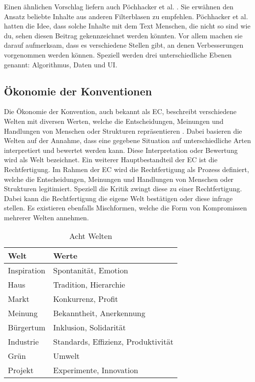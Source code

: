 Einen ähnlichen Vorschlag liefern auch Pöchhacker et al. \cite{rundfunk}.
Sie erwähnen den Ansatz beliebte Inhalte aus anderen Filterblasen zu empfehlen.
Pöchhacker et al. hatten die Idee, dass solche Inhalte mit dem Text \glqq Menschen, die nicht so sind wie du, sehen diesen Beitrag\grqq{} gekennzeichnet werden könnten.
Vor allem machen sie darauf aufmerksam, dass es verschiedene Stellen gibt, an denen Verbesserungen vorgenommen werden können.
Speziell werden drei unterschiedliche Ebenen genannt: Algorithmus, Daten und UI.

\subsection{Ökonomie der Konventionen} \label{subsec:economics-of-conventions}
Die Ökonomie der Konvention, auch bekannt als \ac{EC}, beschreibt verschiedene \glqq Welten\grqq{} mit diversen Werten, welche die Entscheidungen, Meinungen und Handlungen von Menschen oder Strukturen repräsentieren \cite{on-justification, oekonomie-konventionen}.
Dabei basieren die Welten auf der Annahme, dass eine gegebene Situation auf unterschiedliche Arten interpretiert und bewertet werden kann.
Diese Interpretation oder Bewertung wird als Welt bezeichnet.
Ein weiterer Hauptbestandteil der \ac{EC} ist die Rechtfertigung.
Im Rahmen der \ac{EC} wird die Rechtfertigung als Prozess definiert, welche die Entscheidungen, Meinungen und Handlungen von Menschen oder Strukturen legitimiert.
Speziell die Kritik zwingt diese zu einer Rechtfertigung.
Dabei kann die Rechtfertigung die eigene Welt bestätigen oder diese infrage stellen.
Es existieren ebenfalls Mischformen, welche die Form von Kompromissen mehrerer Welten annehmen.
\begin{center}
    \begin{table}[!ht]
        \centering
        \begin{tabular}{|l l|}
            \hline
            Welt        & Werte                               \\ \hline
            Inspiration & Spontanität, Emotion                \\
            Haus        & Tradition, Hierarchie               \\
            Markt       & Konkurrenz, Profit                  \\
            Meinung     & Bekanntheit, Anerkennung            \\
            Bürgertum   & Inklusion, Solidarität              \\
            Industrie   & Standards, Effizienz, Produktivität \\ \hline \hline
            Grün        & Umwelt                              \\
            Projekt     & Experimente, Innovation             \\ \hline
        \end{tabular}
        \caption{Acht Welten}
        \label{table:eight-worlds}
    \end{table}
\end{center}


